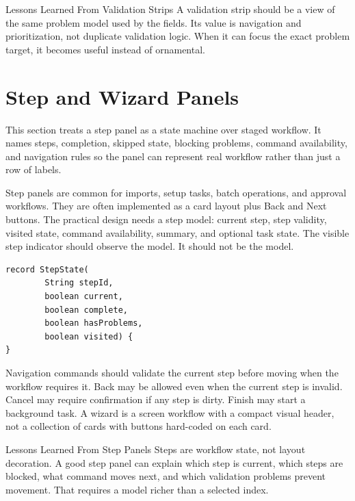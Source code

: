 \begin{principlebox}{Lessons Learned From Validation Strips}
A validation strip should be a view of the same problem model used by the fields.
Its value is navigation and prioritization, not duplicate validation logic. When
it can focus the exact problem target, it becomes useful instead of ornamental.
\end{principlebox}

\section{Step and Wizard Panels}

\begin{roadmapbox}
This section treats a step panel as a state machine over staged workflow. It
names steps, completion, skipped state, blocking problems, command availability,
and navigation rules so the panel can represent real workflow rather than just a
row of labels.
\end{roadmapbox}

Step panels are common for imports, setup tasks, batch operations, and approval
workflows. They are often implemented as a card layout plus Back and Next buttons. The
practical design needs a step model: current step, step validity, visited state, command
availability, summary, and optional task state. The visible step indicator should
observe the model. It should not be the model.

\begin{lstlisting}[caption={A wizard step model names navigation state.}]
record StepState(
        String stepId,
        boolean current,
        boolean complete,
        boolean hasProblems,
        boolean visited) {
}
\end{lstlisting}

Navigation commands should validate the current step before moving when the workflow
requires it. Back may be allowed even when the current step is invalid. Cancel may
require confirmation if any step is dirty. Finish may start a background task. A wizard
is a screen workflow with a compact visual header, not a collection of cards with
buttons hard-coded on each card.

\begin{principlebox}{Lessons Learned From Step Panels}
Steps are workflow state, not layout decoration. A good step panel can explain
which step is current, which steps are blocked, what command moves next, and
which validation problems prevent movement. That requires a model richer than a
selected index.
\end{principlebox}


